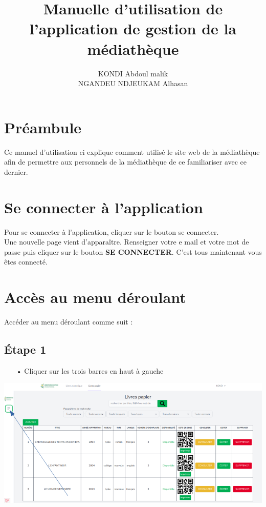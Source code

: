 \documentclass[12pt,a4paper]{article}
\author{KONDI Abdoul malik \\ NGANDEU NDJEUKAM Alhasan}
\title{Manuelle d'utilisation de l'application de gestion de la médiathèque}
\begin{document}
\maketitle
\tableofcontents
\newpage

\section{Préambule}
Ce manuel d'utilisation ci explique comment utilisé le site web de la médiathèque afin
de permettre aux personnels de la médiathèque de ce familiariser avec ce dernier.

\newpage
\section{Se connecter à l'application}
Pour se connecter à l'application, cliquer sur le bouton se connecter.\\
Une nouvelle page vient d'apparaître. Renseigner votre e mail et votre mot de passe 
puis cliquer sur le bouton \textbf{SE CONNECTER}. C'est tous maintenant vous êtes 
connecté.

\newpage
\section{Accès au menu déroulant}
Accéder au menu déroulant comme suit : 
\subsection{Étape 1} 
\begin{itemize}
\item[•] Cliquer sur les trois barres en haut à gauche 
\end{itemize}
\includegraphics[scale=0.5]{images/SelectOuvragePhysique.png}
\end{document}
